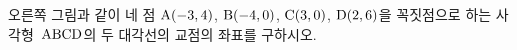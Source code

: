 \noindent\begin{minipage}[t]{0.58\linewidth}\vspace{0pt}\raggedright 오른쪽 그림과 같이 네 점 $\mathrm{A}(-3{,}\mkern3mu\mathopen{}4)$, $\mathrm{B}(-4{,}\mkern3mu\mathopen{}0)$, $\mathrm{C}(3{,}\mkern3mu\mathopen{}0)$, $\mathrm{D}(2{,}\mkern3mu\mathopen{}6)$을 꼭짓점으로 하는 사각형~$\mathrm{ABCD}$의 두 대각선의 교점의 좌표를 구하시오.\end{minipage}\hfill\begin{minipage}[t]{0.4\linewidth}\vspace{0pt}\centering \resizebox{\ifdim\width>\linewidth\linewidth\else\width\fi}{!}{}\end{minipage}\par
